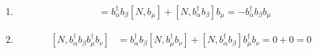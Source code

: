 \documentclass[../../main.tex]{subfiles}
\begin{document}
\begin{enumerate}
{{\begin{enumerate}
\begin{align*}
        )b_{i}
      \right\}\\
      &= \sum_{i}\left\{
        b_{i}^{\dagger}(b_{\alpha}^{\dagger}\cdot 0 + \delta_{i\alpha}b_{\beta}) + (b_{\alpha}^{\dagger}(-\delta_{i\beta}) + 0\cdot b_{\beta})b_{i}
      \right\}\\
      &= \sum_{i}\left(b_{i}^{\dagger}b_{\beta}\delta_{i\alpha} - b_{\alpha}^{\dagger}b_{i}\delta_{i\beta}\right) = 0.
    \end{align*}
    \item
    \begin{align*}
      [N,b_{\alpha}^{\dagger}b_{\beta}b_{\mu}] &= b_{\alpha}^{\dagger}b_{\beta}[N,b_{\mu}] + [N,b_{\alpha}^{\dagger}b_{\beta}]b_{\mu} = -b_{\alpha}^{\dagger}b_{\beta}b_{\mu}
    \end{align*}
    \item
    \begin{align*}
      \boxed{[N,b_{\alpha}^{\dagger}b_{\beta}b_{\mu}^{\dagger}b_{\nu}]} &= b_{\alpha}^{\dagger}b_{\beta}[N, b_{\mu}^{\dagger}b_{\nu}] + [N, b_{\alpha}^{\dagger}b_{\beta}]b_{\mu}^{\dagger}b_{\nu} = 0 + 0 = 0
    \end{align*}
  \end{enumerate}}}
\end{enumerate}
\end{document}

